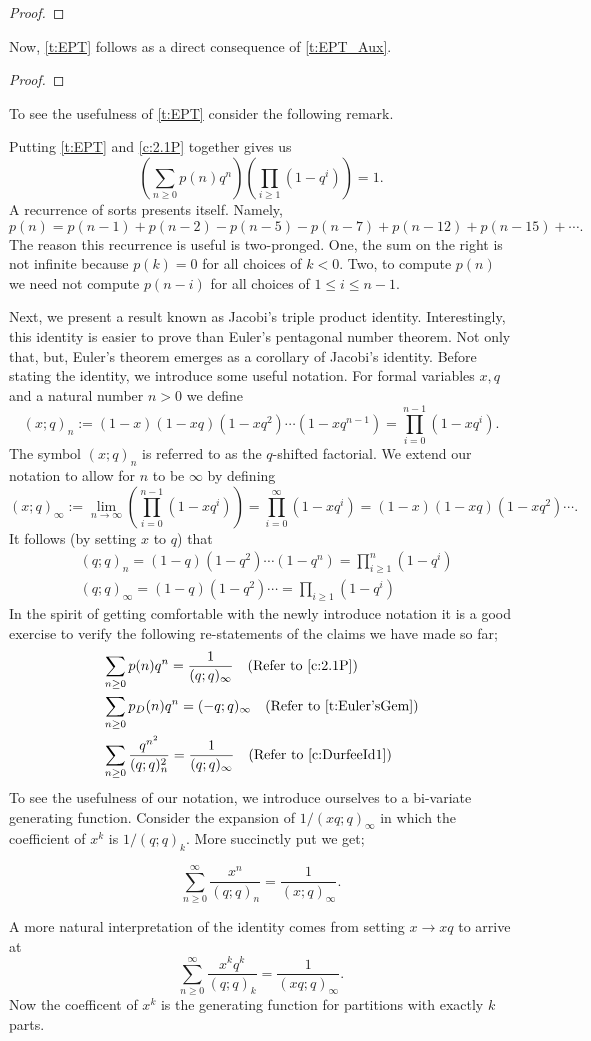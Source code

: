 \begin{proof}
\end{proof}
Now, \cref{t:EPT} follows as a direct consequence of \cref{t:EPT_Aux}.
\begin{proof}
\end{proof}
To see the usefulness of \cref{t:EPT} consider the following remark.
\begin{remark}
Putting \cref{t:EPT} and \cref{c:2.1P} together gives us \[
\left(\sum_{n\geq 0}p(n)q^n\right)\left(\prod_{i\geq 1}(1-q^i)\right) = 1.
\] A recurrence of sorts presents itself. Namely,
\[
p(n) = p(n-1)+p(n-2)-p(n-5)-p(n-7)+p(n-12)+p(n-15)+\cdots. 
\] The reason this recurrence is useful is two-pronged. One, the sum on the right is not infinite because $p(k)=0$ for all choices of $k<0$. Two, to compute $p(n)$ we need not compute $p(n-i)$ for all choices of $1\leq i\leq n-1$.
\end{remark}
Next, we present a result known as Jacobi's triple product identity. Interestingly, this identity is easier to prove than Euler's pentagonal number theorem. Not only that, but, Euler's theorem emerges as a corollary of Jacobi's identity. Before stating the identity, we introduce some useful notation. For formal variables $x,q$ and a natural number $n>0$ we define
\[
(x;q)_n := (1-x)(1-xq)(1-xq^2)\cdots(1-xq^{n-1}) = \prod_{i=0}^{n-1}(1-xq^i).
\]
The symbol $(x;q)_n$ is referred to as the $q$-shifted factorial. We extend our notation to allow for $n$ to be $\infty$ by defining
\[
(x;q)_\infty := \lim_{n\to \infty}\left(\prod_{i=0}^{n-1}(1-xq^i)\right) = \prod_{i=0}^{\infty}(1-xq^i) = (1-x)(1-xq)(1-xq^2)\cdots.
\]
It follows (by setting $x$ to $q$) that
\begin{align*}
    &(q;q)_n = (1-q)(1-q^2)\cdots(1-q^n) = \prod_{i\geq 1}^n (1-q^i)\\
    &(q;q)_\infty = (1-q)(1-q^2)\cdots = \prod_{i\geq 1}(1-q^i)
\end{align*}
\raggedbottom
In the spirit of getting comfortable with the newly introduce notation it is a good exercise to verify the following re-statements of the claims we have made so far;
\begin{align*}
    &\sum_{n \geq 0} p(n) q^n = \dfrac{1}{(q;q)_\infty} \quad (\text{Refer to } \cref{c:2.1P}) \\
    &\sum_{n \geq 0} p_D(n) q^n = (-q;q)_\infty \quad (\text{Refer to } \cref{t:Euler'sGem}) \\
    &\sum_{n \geq 0} \dfrac{q^{n^2}}{(q;q)_n^2} =\dfrac{1}{(q;q)_\infty}\quad (\text{Refer to } \cref{c:DurfeeId1})
\end{align*}
To see the usefulness of our notation, we introduce ourselves to a bi-variate generating function. Consider the expansion of $1/(xq;q)_\infty$ in which the coefficient of $x^k$ is $1/(q;q)_k$. More succinctly put we get;
\begin{claim}
\[\sum_{n\geq 0}^\infty\dfrac{x^n}{(q;q)_n} = \dfrac{1}{(x;q)_\infty}.\]
\end{claim}
A more natural interpretation of the identity comes from setting $x\to xq$ to arrive at
\[
\sum_{n\geq 0}^\infty \dfrac{x^kq^k}{(q;q)_k} = \dfrac{1}{(xq;q)_\infty}.
\]
Now the coefficent of $x^k$ is the generating function for partitions with exactly $k$ parts. 
\endinput
